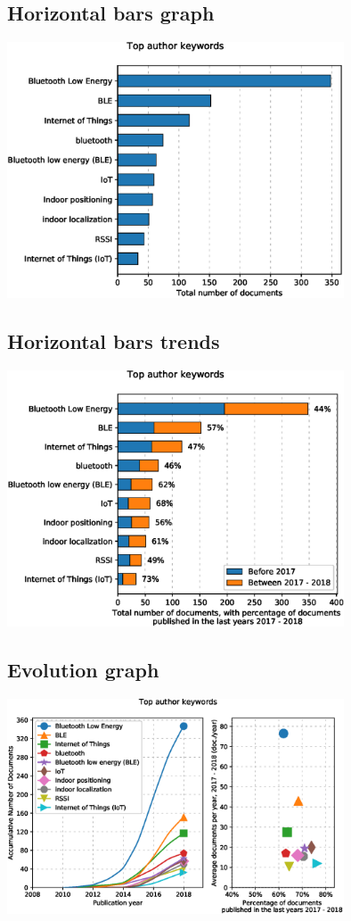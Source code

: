 \documentclass[10pt,letterpaper]{article}
\begin{document}
\subsection{Horizontal bars graph}
\begin{center}
	\includegraphics[width=0.75\textwidth]{./figures/graph_bar.eps}
\end{center}

\subsection{Horizontal bars trends}

\begin{center}
	\includegraphics[width=0.75\textwidth]{./figures/graph_bar_trends.eps}
\end{center}

\subsection{Evolution graph}

\begin{center}
	\includegraphics[width=0.75\textwidth]{./figures/graph_evolution.eps}
\end{center}
\end{document}
